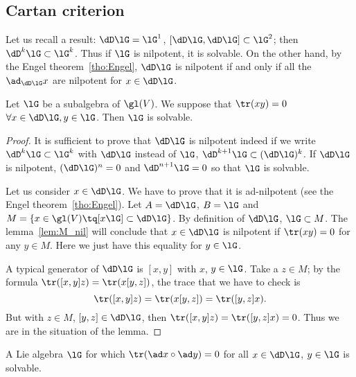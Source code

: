
\subsection{Cartan criterion}

Let us recall a result: $\dD\lG=\lG^1$, $[\dD\lG,\dD\lG]\subset\lG^2$; then $\dD^k\lG\subset\lG^k$. Thus if $\lG$ is nilpotent, it is solvable. On the other hand, by the Engel theorem~\ref{tho:Engel}, $\dD\lG$ is nilpotent if and only if all the $\ad_{\dD\lG}x$ are nilpotent for $x\in\dD\lG$.


\begin{theorem}
Let $\lG$ be a subalgebra of $\gl(V)$. We suppose that $\tr(xy)=0$ $\forall x\in\dD\lG, y\in\lG$. Then $\lG$ is solvable.
\end{theorem}

\begin{proof}
It is sufficient to prove that $\dD\lG$ is nilpotent indeed if we write $\dD^k\lG\subset\lG^k$ with $\dD\lG$ instead of $\lG$, $\dD^{k+1}\lG\subset(\dD\lG)^k$. If $\dD\lG$ is nilpotent, $(\dD\lG)^n=0$ and $\dD^{n+1}\lG=0$ so that $\lG$ is solvable.

Let us consider $x\in\dD\lG$. We have to prove that it is ad-nilpotent (see the Engel theorem~\ref{tho:Engel}). Let $A=\dD\lG$, $B=\lG$ and $M=\{x\in\gl(V)\tq [x\lG]\subset\dD\lG\}$. By definition of $\dD\lG$, $\lG\subset M$. The lemma~\ref{lem:M_nil} will conclude that $x\in\dD\lG$ is nilpotent if $\tr(xy)=0$ for any $y\in M$. Here we just have this equality for $y\in\lG$.

A typical generator of $\dD\lG$ is $[x,y]$ with $x$, $y\in\lG$. Take a $z\in M$; by the formula $\tr([x,y]z)=\tr(x[y,z])$, the trace that we have to check is
\begin{equation}
  \tr([x,y]z)=\tr(x[y,z])
             =\tr([y,z]x).
\end{equation}
But with $z\in M$, $[y,z]\in\dD\lG$, then $\tr([x,y]z)=\tr([y,z]x)=0$. Thus we are in the situation of the lemma.
\end{proof}


\begin{corollary}\label{cor:ad_g_sol}
A Lie algebra $\lG$ for which $\tr(\ad x\circ\ad y)=0$ for all $x\in\dD\lG$, $y\in\lG$ is solvable.
\end{corollary}

